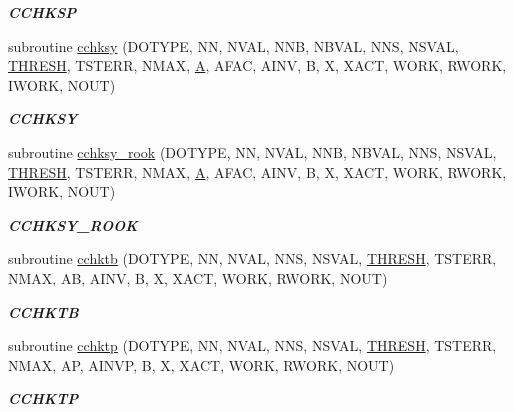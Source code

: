\begin{DoxyCompactItemize}
\begin{DoxyCompactList}\small\item\em {\bfseries C\+C\+H\+K\+S\+P} \end{DoxyCompactList}\item 
subroutine \hyperlink{group__complex__lin_ga670052f496fcc731e642cafb91355ce4}{cchksy} (D\+O\+T\+Y\+P\+E, N\+N, N\+V\+A\+L, N\+N\+B, N\+B\+V\+A\+L, N\+N\+S, N\+S\+V\+A\+L, \hyperlink{zlaqgs_8c_a0656018abfc9fa2821827415f5d5ea57}{T\+H\+R\+E\+S\+H}, T\+S\+T\+E\+R\+R, N\+M\+A\+X, \hyperlink{classA}{A}, A\+F\+A\+C, A\+I\+N\+V, B, X, X\+A\+C\+T, W\+O\+R\+K, R\+W\+O\+R\+K, I\+W\+O\+R\+K, N\+O\+U\+T)
\begin{DoxyCompactList}\small\item\em {\bfseries C\+C\+H\+K\+S\+Y} \end{DoxyCompactList}\item 
subroutine \hyperlink{group__complex__lin_ga4f4dabfe6f2c9b43f50d5a3a2ca424ec}{cchksy\+\_\+rook} (D\+O\+T\+Y\+P\+E, N\+N, N\+V\+A\+L, N\+N\+B, N\+B\+V\+A\+L, N\+N\+S, N\+S\+V\+A\+L, \hyperlink{zlaqgs_8c_a0656018abfc9fa2821827415f5d5ea57}{T\+H\+R\+E\+S\+H}, T\+S\+T\+E\+R\+R, N\+M\+A\+X, \hyperlink{classA}{A}, A\+F\+A\+C, A\+I\+N\+V, B, X, X\+A\+C\+T, W\+O\+R\+K, R\+W\+O\+R\+K, I\+W\+O\+R\+K, N\+O\+U\+T)
\begin{DoxyCompactList}\small\item\em {\bfseries C\+C\+H\+K\+S\+Y\+\_\+\+R\+O\+O\+K} \end{DoxyCompactList}\item 
subroutine \hyperlink{group__complex__lin_ga7edca40325c0861578401d13d0d01a0a}{cchktb} (D\+O\+T\+Y\+P\+E, N\+N, N\+V\+A\+L, N\+N\+S, N\+S\+V\+A\+L, \hyperlink{zlaqgs_8c_a0656018abfc9fa2821827415f5d5ea57}{T\+H\+R\+E\+S\+H}, T\+S\+T\+E\+R\+R, N\+M\+A\+X, A\+B, A\+I\+N\+V, B, X, X\+A\+C\+T, W\+O\+R\+K, R\+W\+O\+R\+K, N\+O\+U\+T)
\begin{DoxyCompactList}\small\item\em {\bfseries C\+C\+H\+K\+T\+B} \end{DoxyCompactList}\item 
subroutine \hyperlink{group__complex__lin_ga7c2ec22f36a1b72882444ce1e77534db}{cchktp} (D\+O\+T\+Y\+P\+E, N\+N, N\+V\+A\+L, N\+N\+S, N\+S\+V\+A\+L, \hyperlink{zlaqgs_8c_a0656018abfc9fa2821827415f5d5ea57}{T\+H\+R\+E\+S\+H}, T\+S\+T\+E\+R\+R, N\+M\+A\+X, A\+P, A\+I\+N\+V\+P, B, X, X\+A\+C\+T, W\+O\+R\+K, R\+W\+O\+R\+K, N\+O\+U\+T)
\begin{DoxyCompactList}\small\item\em {\bfseries C\+C\+H\+K\+T\+P} \end{DoxyCompactList}\item 

\end{DoxyCompactItemize}
